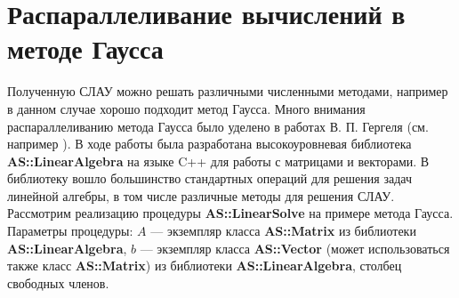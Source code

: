 \documentclass{spisok-article}
\begin{document}

\section{Распараллеливание вычислений в методе Гаусса}
Полученную СЛАУ можно решать различными численными методами, например в данном случае хорошо подходит метод Гаусса. Много внимания распараллеливанию метода Гаусса было уделено в работах В. П. Гергеля (см. например \cite{Gergel}). В ходе работы была разработана высокоуровневая библиотека \textbf{AS::LinearAlgebra} на языке C++ для работы с матрицами и векторами. В библиотеку вошло большинство стандартных операций для решения задач линейной алгебры, в том числе различные методы для решения СЛАУ. Рассмотрим реализацию процедуры \textbf{AS::LinearSolve} на примере метода Гаусса. Параметры процедуры: $A$ --- экземпляр класса \textbf{AS::Matrix} из библиотеки \textbf{AS::LinearAlgebra}, $b$ --- экземпляр класса \textbf{AS::Vector} (может использоваться также класс \textbf{AS::Matrix}) из библиотеки \textbf{AS::LinearAlgebra}, столбец свободных членов.
\end{document}
